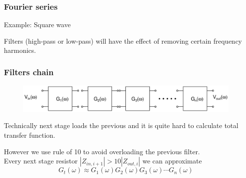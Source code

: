 \documentclass[beamer]{standalone}
\begin{document}
\begin{frame}[t]
 \frametitle{Fourier series}
 \begin{block}{Example: Square wave}
  \begin{center}
  \end{center}
  Filters (high-pass or low-pass) will have the effect of removing certain frequency harmonics.
 \end{block}
\end{frame}

\begin{frame}
 \frametitle{Filters chain}
 \begin{figure}
  \includegraphics[angle=0,width=1.0\textwidth]{./circuits/black_box_transfer_in_freq_chain.pdf}
 \end{figure}
 Technically next stage loads the previous and it is quite hard to
 calculate total transfer function.

 However we use rule of 10 to avoid overloading the previous filter.\\
 Every next stage resistor $|Z_{in,i+1}| > 10 |Z_{out,i}|$ we can approximate
 \[
 G_t(\omega) \approx G_1(\omega) G_2(\omega) G_3(\omega) \cdots G_n(\omega)
 \]
\end{frame}
\end{document}

